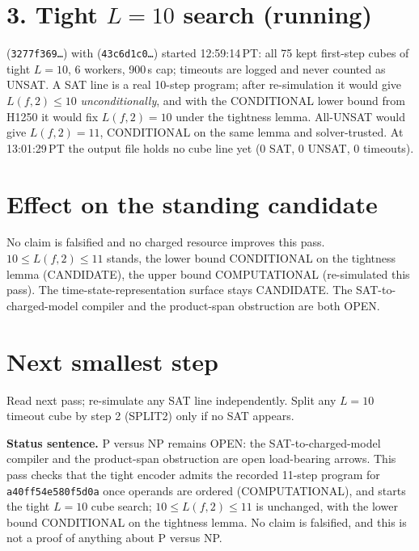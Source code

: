 \documentclass[11pt]{article}
\begin{document}
\section*{3. Tight $L=10$ search (running)}
 (\texttt{3277f369\ldots}) with  (\texttt{43c6d1c0\ldots}) started 12:59:14\,PT: all 75 kept first-step cubes of tight $L=10$, 6 workers, 900\,s cap; timeouts are logged and never counted as UNSAT. A SAT line is a real 10-step program; after re-simulation it would give $L(f,2)\le 10$ \emph{unconditionally}, and with the CONDITIONAL lower bound from H1250 it would fix $L(f,2)=10$ under the tightness lemma. All-UNSAT would give $L(f,2)=11$, CONDITIONAL on the same lemma and solver-trusted. At 13:01:29\,PT the output file holds no cube line yet (0 SAT, 0 UNSAT, 0 timeouts).

\section*{Effect on the standing candidate}
No claim is falsified and no charged resource improves this pass. $10\le L(f,2)\le 11$ stands, the lower bound CONDITIONAL on the tightness lemma (CANDIDATE), the upper bound COMPUTATIONAL (re-simulated this pass). The time-state-representation surface stays CANDIDATE. The SAT-to-charged-model compiler and the product-span obstruction are both OPEN.

\section*{Next smallest step}
Read  next pass; re-simulate any SAT line independently. Split any $L=10$ timeout cube by step 2 (SPLIT2) only if no SAT appears.

\bigskip
\noindent\textbf{Status sentence.} P versus NP remains OPEN: the SAT-to-charged-model compiler and the product-span obstruction are open load-bearing arrows. This pass checks that the tight encoder admits the recorded 11-step program for \texttt{a40ff54e580f5d0a} once operands are ordered (COMPUTATIONAL), and starts the tight $L=10$ cube search; $10\le L(f,2)\le 11$ is unchanged, with the lower bound CONDITIONAL on the tightness lemma. No claim is falsified, and this is not a proof of anything about P versus NP.
\end{document}
